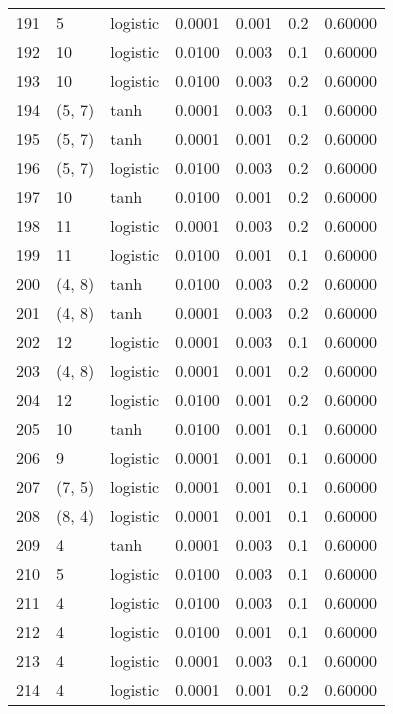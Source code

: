 \begin{tabular}{lllrrrr}
191 &           5 &  logistic &  0.0001 &  0.001 &  0.2 &   0.60000 \\
192 &          10 &  logistic &  0.0100 &  0.003 &  0.1 &   0.60000 \\
193 &          10 &  logistic &  0.0100 &  0.003 &  0.2 &   0.60000 \\
194 &      (5, 7) &      tanh &  0.0001 &  0.003 &  0.1 &   0.60000 \\
195 &      (5, 7) &      tanh &  0.0001 &  0.001 &  0.2 &   0.60000 \\
196 &      (5, 7) &  logistic &  0.0100 &  0.003 &  0.2 &   0.60000 \\
197 &          10 &      tanh &  0.0100 &  0.001 &  0.2 &   0.60000 \\
198 &          11 &  logistic &  0.0001 &  0.003 &  0.2 &   0.60000 \\
199 &          11 &  logistic &  0.0100 &  0.001 &  0.1 &   0.60000 \\
200 &      (4, 8) &      tanh &  0.0100 &  0.003 &  0.2 &   0.60000 \\
201 &      (4, 8) &      tanh &  0.0001 &  0.003 &  0.2 &   0.60000 \\
202 &          12 &  logistic &  0.0001 &  0.003 &  0.1 &   0.60000 \\
203 &      (4, 8) &  logistic &  0.0001 &  0.001 &  0.2 &   0.60000 \\
204 &          12 &  logistic &  0.0100 &  0.001 &  0.2 &   0.60000 \\
205 &          10 &      tanh &  0.0100 &  0.001 &  0.1 &   0.60000 \\
206 &           9 &  logistic &  0.0001 &  0.001 &  0.1 &   0.60000 \\
207 &      (7, 5) &  logistic &  0.0001 &  0.001 &  0.1 &   0.60000 \\
208 &      (8, 4) &  logistic &  0.0001 &  0.001 &  0.1 &   0.60000 \\
209 &           4 &      tanh &  0.0001 &  0.003 &  0.1 &   0.60000 \\
210 &           5 &  logistic &  0.0100 &  0.003 &  0.1 &   0.60000 \\
211 &           4 &  logistic &  0.0100 &  0.003 &  0.1 &   0.60000 \\
212 &           4 &  logistic &  0.0100 &  0.001 &  0.1 &   0.60000 \\
213 &           4 &  logistic &  0.0001 &  0.003 &  0.1 &   0.60000 \\
214 &           4 &  logistic &  0.0001 &  0.001 &  0.2 &   0.60000 \\

\end{tabular}
